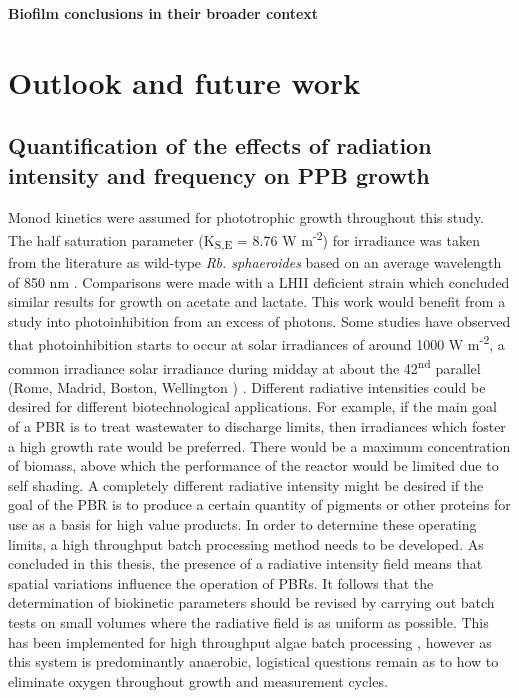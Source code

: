 \skippingparagraph
\textbf{Biofilm conclusions in their broader context}



\section{Outlook and future work}
\subsection{Quantification of the effects of radiation intensity and frequency on PPB growth}
Monod kinetics were assumed for phototrophic growth throughout this study. The half saturation parameter (K\textsubscript{S,E} = 8.76 W m\textsuperscript{-2}) for irradiance was taken from the literature as wild-type \textit{Rb. sphaeroides} based on an average wavelength of 850 nm \cite{eltsova2016}. Comparisons were made with a LHII deficient strain which concluded similar results for growth on acetate and lactate. This work would benefit from a study into photoinhibition from an excess of photons. Some studies have observed that photoinhibition starts to occur at solar irradiances of around 1000 W m\textsuperscript{-2}, a common irradiance solar irradiance during midday at about the 42\textsuperscript{nd} parallel (Rome, Madrid, Boston, Wellington \etc) \cite{adessi2014a,miyake1999}. 
\skippingparagraph
Different radiative intensities could be desired for different biotechnological applications. For example, if the main goal of a PBR is to treat wastewater to discharge limits, then irradiances which foster a high growth rate would be preferred. There would be a maximum concentration of biomass, above which the performance of the reactor would be limited due to self shading. A completely different radiative intensity might be desired if the goal of the PBR is to produce a certain quantity of pigments or other proteins for use as a basis for high value products.
\skippingparagraph
In order to determine these operating limits, a high throughput batch processing method needs to be developed. As concluded in this thesis, the presence of a radiative intensity field means that spatial variations influence the operation of PBRs. It follows that the determination of biokinetic parameters should be revised by carrying out batch tests on small volumes where the radiative field is as uniform as possible. This has been implemented for high throughput algae batch processing \cite{vanwagenen2014}, however as this system is predominantly anaerobic, logistical questions remain as to how to eliminate oxygen throughout growth and measurement cycles.
